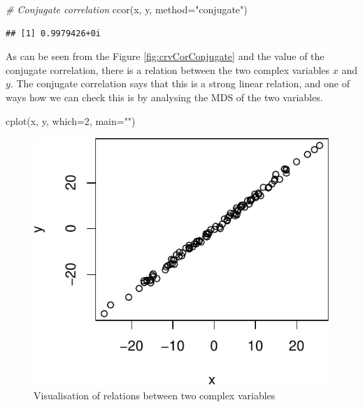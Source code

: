 \documentclass[
]{book}
\newenvironment{Shaded}{\begin{snugshade}}{\end{snugshade}}
\newcommand{\AttributeTok}[1]{\textcolor[rgb]{0.77,0.63,0.00}{#1}}
\newcommand{\CommentTok}[1]{\textcolor[rgb]{0.56,0.35,0.01}{\textit{#1}}}
\newcommand{\DecValTok}[1]{\textcolor[rgb]{0.00,0.00,0.81}{#1}}
\newcommand{\FunctionTok}[1]{\textcolor[rgb]{0.00,0.00,0.00}{#1}}
\newcommand{\NormalTok}[1]{#1}
\newcommand{\StringTok}[1]{\textcolor[rgb]{0.31,0.60,0.02}{#1}}
\begin{document}
\begin{Shaded}
\begin{Highlighting}[]
\CommentTok{\# Conjugate correlation}
\FunctionTok{ccor}\NormalTok{(x, y, }\AttributeTok{method=}\StringTok{"conjugate"}\NormalTok{)}
\end{Highlighting}
\end{Shaded}

\begin{verbatim}
## [1] 0.9979426+0i
\end{verbatim}

As can be seen from the Figure \ref{fig:crvCorConjugate} and the value of the conjugate correlation, there is a relation between the two complex variables \(x\) and \(y\). The conjugate correlation says that this is a strong linear relation, and one of ways how we can check this is by analysing the MDS of the two variables.

\begin{Shaded}
\begin{Highlighting}[]
\FunctionTok{cplot}\NormalTok{(x, y, }\AttributeTok{which=}\DecValTok{2}\NormalTok{, }\AttributeTok{main=}\StringTok{""}\NormalTok{)}
\end{Highlighting}
\end{Shaded}

\begin{figure}
\centering
\includegraphics{Svetunkov---Svetunkov---Complex-Dynamic-Models_files/figure-latex/crvCorConjugateMDS-1.pdf}
\caption{\label{fig:crvCorConjugateMDS}Visualisation of relations between two complex variables}
\end{figure}
\end{document}
